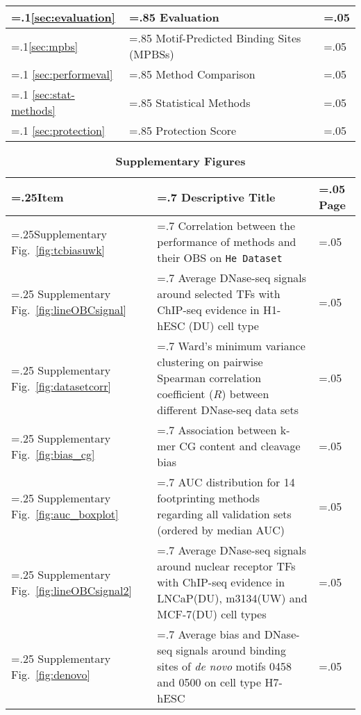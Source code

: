 \documentclass[11pt]{article}
\begin{document}
\begin{table*}[h!]
\begin{center}
\begin{tabularx}{\textwidth}{ |>{\hsize=.1\hsize}X|>{\hsize=.85\hsize}X|>{\hsize=.05\hsize}X| }
\hline
\ref{sec:evaluation} & Evaluation  & \pageref{sec:evaluation} \\
\hline
\ref{sec:mpbs} & Motif-Predicted Binding Sites (MPBSs)  & \pageref{sec:mpbs} \\
\hline
\ref{sec:performeval} & Method Comparison  & \pageref{sec:performeval} \\
\hline
\ref{sec:stat-methods} & Statistical Methods  & \pageref{sec:stat-methods} \\
\hline
\ref{sec:protection} & Protection Score  & \pageref{sec:protection} \\
\hline
\end{tabularx}
\end{center}
\end{table*}

\clearpage

\begin{table*}[h!]
\small
\begin{flushleft}
\caption*{\textbf{{\small Supplementary Figures}}}
\vspace{-0.4cm}
\end{flushleft}
\begin{center}
\renewcommand{\arraystretch}{1.2}
\begin{tabularx}{\textwidth}{ |>{\hsize=.25\hsize}X|>{\hsize=.7\hsize}X|>{\hsize=.05\hsize}X| }
\hline
\textbf{Item} & \textbf{Descriptive Title} & \textbf{Page}  \\
\hline
Supplementary Fig.~\ref{fig:tcbiasuwk} & Correlation between the performance of methods and their OBS on {\tt He Dataset} & \pageref{fig:tcbiasuwk} \\
\hline
Supplementary Fig.~\ref{fig:lineOBCsignal} & Average DNase-seq signals around selected TFs with ChIP-seq evidence in H1-hESC (DU) cell type & \pageref{fig:lineOBCsignal} \\
\hline
Supplementary Fig.~\ref{fig:datasetcorr} & Ward's minimum variance clustering on pairwise Spearman correlation coefficient ($R$) between different DNase-seq data sets & \pageref{fig:datasetcorr} \\
\hline
Supplementary Fig.~\ref{fig:bias_cg} & Association between k-mer CG content and cleavage bias & \pageref{fig:bias_cg} \\
\hline
Supplementary Fig.~\ref{fig:auc_boxplot} & AUC distribution for 14 footprinting methods regarding all validation sets (ordered by median AUC) & \pageref{fig:auc_boxplot} \\
\hline
Supplementary Fig.~\ref{fig:lineOBCsignal2} & Average DNase-seq signals around nuclear receptor TFs with ChIP-seq evidence in LNCaP(DU), m3134(UW) and MCF-7(DU) cell types & \pageref{fig:lineOBCsignal2} \\
\hline
Supplementary Fig.~\ref{fig:denovo} & Average bias and DNase-seq signals around binding sites of \emph{de novo} motifs 0458 and 0500 on cell type H7-hESC & \pageref{fig:denovo} \\
\hline
\end{tabularx}
\end{center}
\end{table*}
\end{document}
